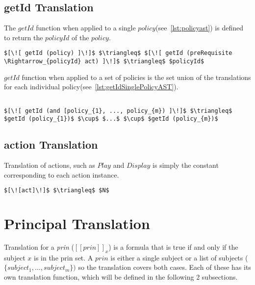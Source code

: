\subsection{getId Translation}\label{sec:getIdtranslation}

The $getId$ function when applied to a single $policy$(see~\ref{lst:policyast}) is defined to return the $policyId$ of the $policy$.

\lstset{mathescape, language=AST}  
\begin{lstlisting}[frame=single, caption={getId for a Single policy},label={lst:getIdSinglePolicyAST}]
$[\![ getId (policy) ]\!]$ $\triangleq$ $[\![ getId (preRequisite \Rightarrow_{policyId} act) ]\!]$ $\triangleq$ $policyId$
\end{lstlisting}

$getId$ function when applied to a set of policies is the set union of the translations for each individual policy(see~\ref{lst:getIdSinglePolicyAST}).

\lstset{mathescape, language=AST}  
\begin{lstlisting}[frame=single, caption={getId for Policies},label={lst:getIdAndPolicyAST}]

$[\![ getId (and [policy_{1}, ..., policy_{m}) ]\!]$ $\triangleq$ $getId (policy_{1})$ $\cup$ $...$ $\cup$ $getId (policy_{m})$
\end{lstlisting}

\subsection{action Translation}\label{sec:acttranslation}

Translation of actions, such as $Play$ and $Display$ is simply the constant corresponding to each action instance.

\lstset{mathescape, language=AST}  
\begin{lstlisting}[frame=single, caption={act Translation},label={lst:actiontranslationAST}]
$[\![act]\!]$ $\triangleq$ $N$
\end{lstlisting}


\section{Principal Translation}
Translation for a \emph{prin} ($[\![ prin ]\!]_{x}$) is a formula that is true if and only if the subject $x$ is in the prin set. A $prin$ is either a single subject or a list of subjects ($\{ subject_{1}, ..., subject_{m} \})$ so the translation covers both cases. Each of these has its own translation function, which will be defined in the following 2 subsections.


